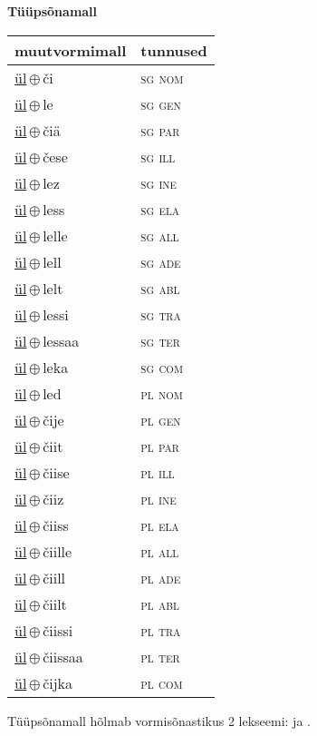 

\vspace{3.5em}
\noindent \begin{minipage}{\textwidth}
\noindent \textbf{Tüüpsõnamall \,}\\

\begin{sideways}
\begin{tabular}{l l}
muutvormimall & tunnused \\
\hline
\underline{ül}\,$\oplus$\,či & \textsc{ sg nom } \\
\underline{ül}\,$\oplus$\,le & \textsc{ sg gen } \\
\underline{ül}\,$\oplus$\,čiä & \textsc{ sg par } \\
\underline{ül}\,$\oplus$\,čese & \textsc{ sg ill } \\
\underline{ül}\,$\oplus$\,lez & \textsc{ sg ine } \\
\underline{ül}\,$\oplus$\,less & \textsc{ sg ela } \\
\underline{ül}\,$\oplus$\,lelle & \textsc{ sg all } \\
\underline{ül}\,$\oplus$\,lell & \textsc{ sg ade } \\
\underline{ül}\,$\oplus$\,lelt & \textsc{ sg abl } \\
\underline{ül}\,$\oplus$\,lessi & \textsc{ sg tra } \\
\underline{ül}\,$\oplus$\,lessaa & \textsc{ sg ter } \\
\underline{ül}\,$\oplus$\,leka & \textsc{ sg com } \\
\underline{ül}\,$\oplus$\,led & \textsc{ pl nom } \\
\underline{ül}\,$\oplus$\,čije & \textsc{ pl gen } \\
\underline{ül}\,$\oplus$\,čiit & \textsc{ pl par } \\
\underline{ül}\,$\oplus$\,čiise & \textsc{ pl ill } \\
\underline{ül}\,$\oplus$\,čiiz & \textsc{ pl ine } \\
\underline{ül}\,$\oplus$\,čiiss & \textsc{ pl ela } \\
\underline{ül}\,$\oplus$\,čiille & \textsc{ pl all } \\
\underline{ül}\,$\oplus$\,čiill & \textsc{ pl ade } \\
\underline{ül}\,$\oplus$\,čiilt & \textsc{ pl abl } \\
\underline{ül}\,$\oplus$\,čiissi & \textsc{ pl tra } \\
\underline{ül}\,$\oplus$\,čiissaa & \textsc{ pl ter } \\
\underline{ül}\,$\oplus$\,čijka & \textsc{ pl com } \\
\end{tabular}
\end{sideways}
\label{tab:tüüpsõnamall-ülči}

\end{minipage}

 
\vspace{1em}
\noindent Tüüpsõnamall  hõlmab vormisõnastikus 2 lekseemi:  ja .

